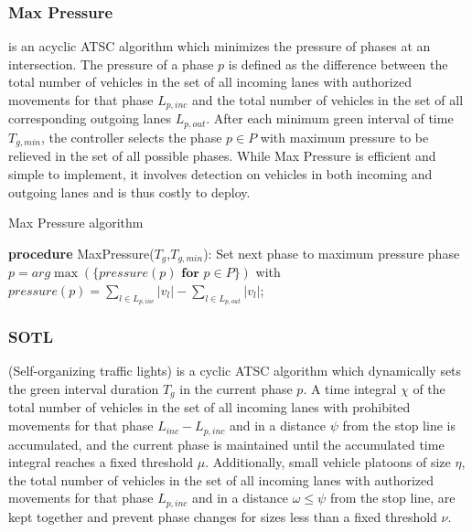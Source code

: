 \documentclass[journal]{IEEEtran}
\begin{document}
\subsubsection{Max Pressure} \cite{varaiya2013max, genders2019opensource} is an acyclic ATSC algorithm which minimizes the pressure of phases at an intersection. The pressure of a phase $p$ is defined as the difference between the total number of vehicles in the set of all incoming lanes with authorized movements for that phase $L_{p,inc}$ and the total number of vehicles in the set of all corresponding outgoing lanes $L_{p,out}$. After each minimum green interval of time $T_{g,min}$, the controller selects the phase $p \in P$ with maximum pressure to be relieved in the set of all possible phases. While Max Pressure is efficient and simple to implement, it involves detection on vehicles in both incoming and outgoing lanes and is thus costly to deploy. 
\\

\begin{algorithm}[H]
\caption*{Max Pressure algorithm}
\begin{algorithmic}
    \STATE \textbf{procedure} MaxPressure($T_g$,$T_{g,min}$):
        \STATE Set next phase to maximum pressure phase
        \STATE $p = arg\max(\{pressure(p) \textbf{ for } p \in P\})$
        \STATE with $pressure(p) = \sum_{l \in L_{p,inc}} |v_l| - \sum_{l \in L_{p,out}} |v_l|$;
    \ENDIF
\end{algorithmic}
\end{algorithm}

\subsubsection{SOTL} \cite{gershenson2004self, genders2019opensource} (Self-organizing traffic lights) is a cyclic ATSC algorithm which dynamically sets the green interval duration $T_g$ in the current phase $p$. A time integral $\chi$ of the total number of vehicles in the set of all incoming lanes with prohibited movements for that phase $L_{inc} - L_{p,inc}$ and in a distance $\psi$ from the stop line is accumulated, and the current phase is maintained until the accumulated time integral reaches a fixed threshold $\mu$. Additionally, small vehicle platoons of size $\eta$, the total number of vehicles in the set of all incoming lanes with authorized movements for that phase $L_{p,inc}$ and in a distance $\omega \le \psi$ from the stop line, are kept together and prevent phase changes for sizes less than a fixed threshold $\nu$. 
\end{document}
